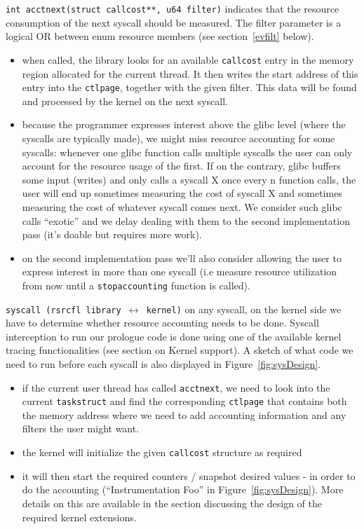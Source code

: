 \documentclass[12pt]{article}
\def\_{\textunderscore\-}
\begin{document}
{\color{blue}\texttt{int acct\_next(struct call\_cost**, u64 filter)}} indicates that the resource consumption of the next syscall should be measured. The filter parameter is a logical \textsc{OR} between enum resource members (see section~\ref{evfilt} below).
\begin{itemize}
\item when called, the library looks for an available \texttt{call\_cost} entry in the memory region allocated for the current thread. It then writes the start address of this entry into the \texttt{ctl\_page}, together with the given filter. This data will be found and processed by the kernel on the next syscall. 
\item because the programmer expresses interest above the glibc level (where the syscalls are typically made), we might miss resource accounting for some syscalls: whenever one glibc function calls multiple syscalls the user can only account for the resource usage of the first. If on the contrary, glibc buffers some input (writes) and only calls a syscall X once every n function calls, the user will end up sometimes measuring the cost of syscall X and sometimes measuring the cost of whatever syscall comes next. We consider such glibc calls “exotic” and we delay dealing with them to the second implementation pass (it’s doable but requires more work).
\item on the second implementation pass we’ll also consider allowing the user to express interest in more than one syscall (i.e measure resource utilization from now until a \texttt{stop\_accounting} function is called). 
\end{itemize}

{\color{red}\texttt{syscall (rsrcfl library $\longleftrightarrow$ kernel)}} on any syscall, on the kernel side we have to determine whether resource accounting needs to be done. Syscall interception to run our prologue code is done using one of the available kernel tracing functionalities (see section on Kernel support). A sketch of what code we need to run before each syscall is also displayed in Figure~\ref{fig:sysDesign}.
\begin{itemize}
\item if the current user thread has called \texttt{acct\_next}, we need to look into the current \texttt{task\_struct} and find the corresponding \texttt{ctl\_page} that contains both the memory address where we need to add accounting information and any filters the user might want.
\item the kernel will initialize the given \texttt{call\_cost} structure as required
\item it will then start the required counters / snapshot desired values - in order to do the accounting (“Instrumentation Foo” in Figure~\ref{fig:sysDesign}). More details on this are available in the section discussing the design of the required kernel extensions.
\end{itemize}
\end{document}
